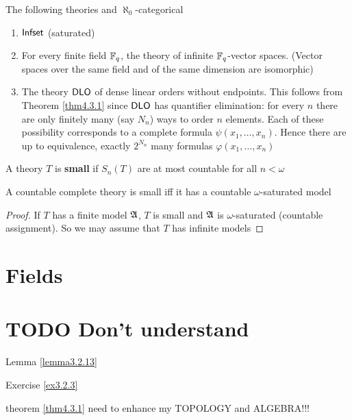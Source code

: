 \documentclass[11pt]{article}
\begin{document}
\begin{examplle}[]
The following theories and \(\aleph_0\)-categorical
\begin{enumerate}
\item \(\operatorname{\textsf{Infset}}\) (saturated)
\item For every finite field \(\mathbb{F}_q\), the theory of infinite \(\mathbb{F}_q\)-vector
spaces. (Vector spaces over the same field and of the same dimension are
isomorphic)
\item The theory \(\operatorname{\textsf{DLO}}\) of dense linear orders without endpoints. This follows
from Theorem \ref{thm4.3.1} since \(\operatorname{\textsf{DLO}}\) has quantifier elimination: for
every \(n\) there are only finitely many (say \(N_n\)) ways to order \(n\)
elements. Each of these possibility corresponds to a complete formula
\(\psi(x_1,\dots,x_n)\). Hence there are up to equivalence, exactly
\(2^{N_n}\) many formulas \(\varphi(x_1,\dots,x_n)\)
\end{enumerate}
\end{examplle}

\begin{definition}[]
A theory \(T\) is \textbf{small} if \(S_n(T)\) are at most countable for all \(n<\omega\)
\end{definition}

\begin{lemma}[]
A countable complete theory is small iff it has a countable
\(\omega\)-saturated model
\end{lemma}

\begin{proof}
If \(T\) has a finite model \(\mathfrak{A}\), \(T\) is small and \(\mathfrak{A}\) is
\(\omega\)-saturated (countable assignment). So we may assume that \(T\) has infinite models
\end{proof}


\appendix
\section{Fields}
\label{sec:org95fd940}
\section{{\bfseries\sffamily TODO} Don't understand}
\label{sec:org1ad78d0}
Lemma \ref{lemma3.2.13}

Exercise \ref{ex3.2.3}

theorem \ref{thm4.3.1} need to enhance my TOPOLOGY and ALGEBRA!!!

\label{Problem1}
\end{document}
